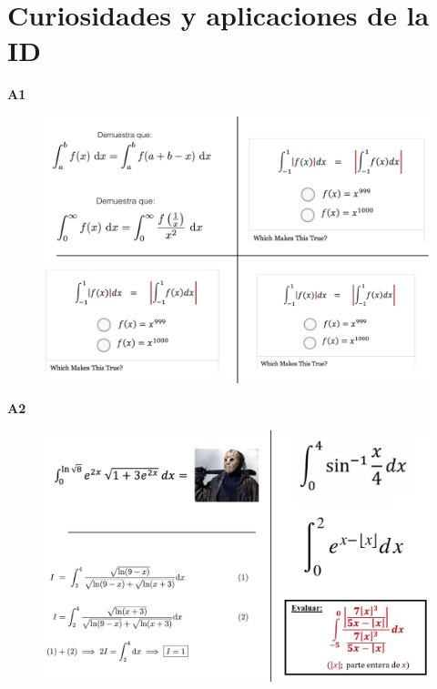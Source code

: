 
\section{Curiosidades y aplicaciones de la ID}

\textbf{A1} \begin{figure}[H]
		\centering
		\includegraphics[width=.9\textwidth]{imagenes/imagenes08/T08IM31.png}
	\end{figure}
 

 
  \textbf{A2}  \begin{figure}[H]
		\centering
		\includegraphics[width=1\textwidth]{imagenes/imagenes08/T08IM32.png}
	\end{figure}
 
 
 
